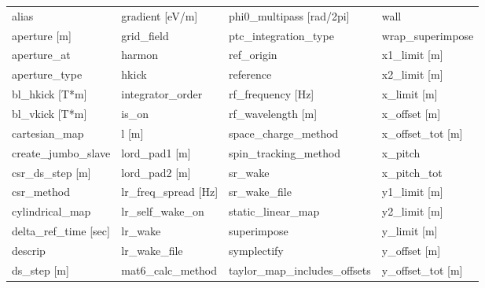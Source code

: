  \begin{tabular}{llll} \toprule
alias                            & gradient [eV/m]                  & phi0_multipass [rad/2pi]         & wall                             \\
aperture [m]                     & grid_field                       & ptc_integration_type             & wrap_superimpose                 \\
aperture_at                      & harmon                           & ref_origin                       & x1_limit [m]                     \\
aperture_type                    & hkick                            & reference                        & x2_limit [m]                     \\
bl_hkick [T*m]                   & integrator_order                 & rf_frequency [Hz]                & x_limit [m]                      \\
bl_vkick [T*m]                   & is_on                            & rf_wavelength [m]                & x_offset [m]                     \\
cartesian_map                    & l [m]                            & space_charge_method              & x_offset_tot [m]                 \\
create_jumbo_slave               & lord_pad1 [m]                    & spin_tracking_method             & x_pitch                          \\
csr_ds_step [m]                  & lord_pad2 [m]                    & sr_wake                          & x_pitch_tot                      \\
csr_method                       & lr_freq_spread [Hz]              & sr_wake_file                     & y1_limit [m]                     \\
cylindrical_map                  & lr_self_wake_on                  & static_linear_map                & y2_limit [m]                     \\
delta_ref_time [sec]             & lr_wake                          & superimpose                      & y_limit [m]                      \\
descrip                          & lr_wake_file                     & symplectify                      & y_offset [m]                     \\
ds_step [m]                      & mat6_calc_method                 & taylor_map_includes_offsets      & y_offset_tot [m]                 \\

\end{tabular}
